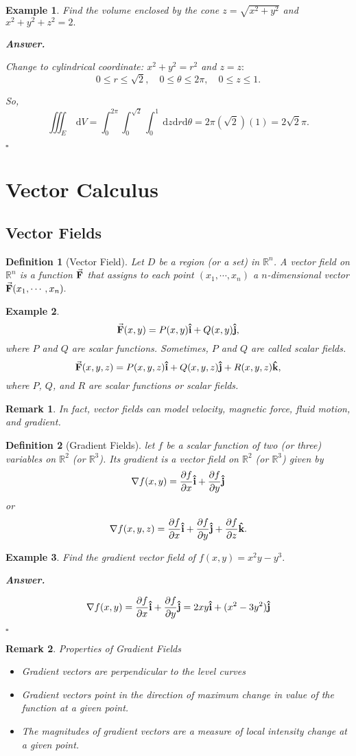 \documentclass[12pt,a4paper]{article}
\newtheorem{df}{Definition}[subsection]
\newtheorem{eg}{Example}[subsection]
\newenvironment*{ans}{\par\indent\textbf{\textit{Answer. }}\par}{\par\hfill{$\square$}\par}
\newtheorem*{rmk}{\indent Remark}
\def\dsst{\displaystyle}
\def\R{{\mathbb{R}}}
\def\d{{\mathrm{d}}}
\def\dz{\d z}
\def\dV{\d V}
\def\iiintE{\dsst\iiint_E}
\def\veci{\vu{\boldsymbol{\textbf{i}}}}
\def\vecj{\vu{\boldsymbol{\textbf{j}}}}
\def\veck{\vu{\boldsymbol{\textbf{k}}}}
\def\F{\va{\boldsymbol{\textbf{F}}}}
\begin{document}
\begin{eg}
	Find the volume enclosed by the cone $z=\sqrt{x^2+y^2}$ and $x^2+y^2+z^2=2.$
	\begin{ans}
		Change to cylindrical coordinate: $x^2+y^2=r^2$ and $z=z:$ \[0\leq r\leq\sqrt{2},\quad 0\leq\theta\leq2\pi,\quad 0\leq z\leq1.\]\par So, \[\iiintE\ \dV=\int_0^{2\pi}\int_0^{\sqrt{2}}\int_0^1\ \dz\d r\d\theta=2\pi(\sqrt{2})(1)=2\sqrt{2}\pi.\]
	\end{ans}
\end{eg}

\newpage
\section{Vector Calculus}
\subsection{Vector Fields}
\begin{df}[Vector Field]
	Let $D$ be a region (or a set) in $\R^n$. A vector field on $\R^n$ is a function $\F$ that assigns to each point $(x_1,\cdots,x_n)$ a $n$-dimensional vector $\F(x_1,\cdots,x_n).$	
\end{df}
\begin{eg}
	\[\F(x,y)=P(x,y)\veci+Q(x,y)\vecj,\] where $P$ and $Q$ are scalar functions. Sometimes, $P$ and $Q$ are called scalar fields. \[\F(x,y,z)=P(x,y,z)\veci+Q(x,y,z)\vecj+R(x,y,z)\veck,\] where $P$, $Q$, and $R$ are scalar functions or scalar fields.
\end{eg}
\begin{rmk}
	In fact, vector fields can model velocity, magnetic force, fluid motion, and gradient.	
\end{rmk}
\begin{df}[Gradient Fields]
	let $f$ be a scalar function of two (or three) variables on $\R^2$ (or $\R^3$). Its gradient is a vector field on $\R^2$ (or $\R^3$) given by \[\nabla f(x,y)=\pdv{f}{x}(x,y)\veci+\pdv{f}{y}\vecj\] or \[\nabla f(x,y,z)=\pdv{f}{x}(x,y,z)\veci+\pdv{f}{y}(x,y,z)\vecj+\pdv{f}{z}(x,y,z)\veck.\]	
\end{df}
\begin{eg}
	Find the gradient vector field of $f(x,y)=x^2y-y^3.$
	\begin{ans}
		\[\nabla f(x,y)=\pdv{f}{x}\veci+\pdv{f}{y}\vecj=2xy\veci+(x^2-3y^2)\vecj\]
	\end{ans}	
\end{eg}
\begin{rmk}
Properties of Gradient Fields
	\begin{itemize}
		\item Gradient vectors are perpendicular to the level curves
		\item Gradient vectors point in the direction of maximum change in value of the function at a given point.
		\item The magnitudes of gradient vectors are a measure of local intensity change at a given point.
	\end{itemize}
\end{rmk}
\end{document}
